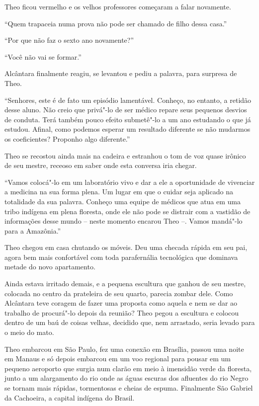 Theo ficou vermelho e os velhos professores começaram a falar novamente.

``Quem trapaceia numa prova não pode ser chamado de filho dessa casa.''

``Por que não faz o sexto ano novamente?''

``Você não vai se formar.''

Alcântara finalmente reagiu, se levantou e pediu a palavra, para
surpresa de Theo.

``Senhores, este é de fato um episódio lamentável. Conheço, no entanto,
a retidão desse aluno. Não creio que privá"-lo de ser médico repare seus
pequenos desvios de conduta. Terá também pouco efeito submetê"-lo a um
ano estudando o que já estudou. Afinal, como podemos esperar um
resultado diferente se não mudarmos os coeficientes? Proponho algo
diferente.''

Theo se recostou ainda mais na cadeira e estranhou o tom de voz quase irônico de
seu mestre, receoso em saber onde esta conversa iria chegar.

``Vamos colocá"-lo em um laboratório vivo e dar a ele a oportunidade de
vivenciar a medicina na sua forma plena. Um lugar em que o cuidar seja
aplicado na totalidade da sua palavra. Conheço uma equipe de médicos que
atua em uma tribo indígena em plena floresta, onde ele não pode se
distrair com a vastidão de informações desse mundo -- neste momento
encarou Theo --. Vamos mandá"-lo para a Amazônia.''

\asterisc

Theo chegou em casa chutando os móveis. Deu uma checada rápida em seu
pai, agora bem mais confortável com toda parafernália tecnológica que
dominava metade do novo apartamento.

Ainda estava irritado demais, e a pequena escultura que ganhou de seu
mestre, colocada no centro da prateleira de seu quarto, parecia zombar
dele. Como Alcântara teve coragem de fazer uma proposta como aquela e
nem se dar ao trabalho de procurá"-lo depois da reunião? Theo pegou a escultura e
colocou dentro de um baú de coisas velhas, decidido que, nem arrastado,
seria levado para o meio do mato.

\asterisc

Theo embarcou em São Paulo, fez uma conexão em Brasília, passou uma
noite em Manaus e só depois embarcou em um voo regional para pousar em
um pequeno aeroporto que surgia num clarão em meio à imensidão verde da
floresta, junto a um alargamento do rio onde as águas escuras dos
afluentes do rio Negro se tornam mais rápidas, tormentosas e cheias de
espuma. Finalmente São Gabriel da Cachoeira, a capital indígena do
Brasil.


